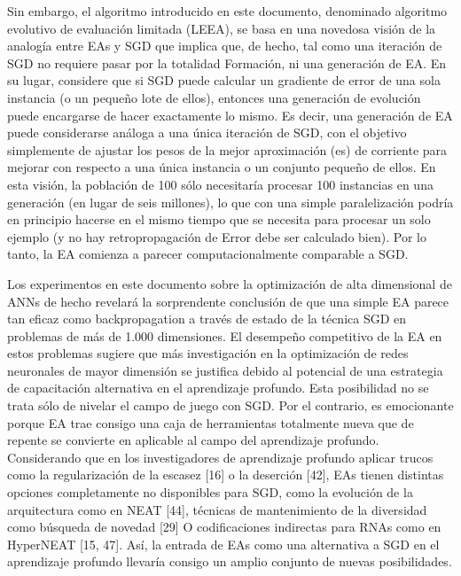 Sin embargo, el algoritmo introducido en este documento, denominado algoritmo evolutivo de evaluación limitada (LEEA), se basa en una novedosa visión de la analogía entre EAs y SGD que implica que, de hecho, tal como una iteración de SGD no requiere pasar por la totalidad Formación, ni una generación de EA. En su lugar, considere que si SGD puede calcular un gradiente de error de una sola instancia (o un pequeño lote de ellos), entonces una generación de evolución puede encargarse de hacer exactamente lo mismo. Es decir, una generación de EA puede considerarse análoga a una única iteración de SGD, con el objetivo simplemente de ajustar los pesos de la mejor aproximación (es) de corriente para mejorar con respecto a una única instancia o un conjunto pequeño de ellos. En esta visión, la población de 100 sólo necesitaría procesar 100 instancias en una generación (en lugar de seis millones), lo que con una simple paralelización podría en principio hacerse en el mismo tiempo que se necesita para procesar un solo ejemplo (y no hay retropropagación de Error debe ser calculado bien). Por lo tanto, la EA comienza a parecer computacionalmente comparable a SGD.

Los experimentos en este documento sobre la optimización de alta dimensional de ANNs de hecho revelará la sorprendente conclusión de que una simple EA parece tan eficaz como backpropagation a través de estado de la técnica SGD en problemas de más de 1.000 dimensiones. El desempeño competitivo de la EA en estos problemas sugiere que más investigación en la optimización de redes neuronales de mayor dimensión se justifica debido al potencial de una estrategia de capacitación alternativa en el aprendizaje profundo. Esta posibilidad no se trata sólo de nivelar el campo de juego con SGD. Por el contrario, es emocionante porque EA trae consigo una caja de herramientas totalmente nueva que de repente se convierte en aplicable al campo del aprendizaje profundo. Considerando que en los investigadores de aprendizaje profundo aplicar trucos como la regularización de la escasez [16] o la deserción [42], EAs tienen distintas opciones completamente no disponibles para SGD, como la evolución de la arquitectura como en NEAT [44], técnicas de mantenimiento de la diversidad como búsqueda de novedad [29] O codificaciones indirectas para RNAs como en HyperNEAT [15, 47]. Así, la entrada de EAs como una alternativa a SGD en el aprendizaje profundo llevaría consigo un amplio conjunto de nuevas posibilidades.












